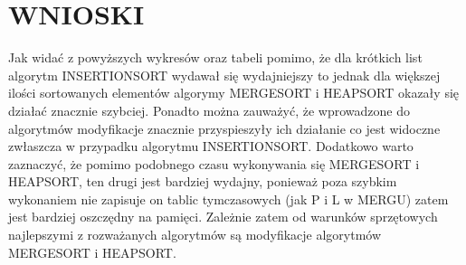 \documentclass{article}
\begin{document}
\section*{WNIOSKI}
Jak widać z powyższych wykresów oraz tabeli pomimo, że dla krótkich list algorytm INSERTIONSORT wydawał się wydajniejszy to jednak dla większej ilości sortowanych elementów algorymy MERGESORT i HEAPSORT okazały się działać znacznie szybciej. Ponadto można zauważyć, że wprowadzone do algorytmów modyfikacje znacznie przyspieszyły ich działanie co jest widoczne zwłaszcza w przypadku algorytmu INSERTIONSORT. Dodatkowo warto zaznaczyć, że pomimo podobnego czasu wykonywania się MERGESORT i HEAPSORT, ten drugi jest bardziej wydajny, ponieważ poza szybkim wykonaniem nie zapisuje on tablic tymczasowych (jak P i L w MERGU) zatem jest bardziej oszczędny na pamięci. Zależnie zatem od warunków sprzętowych najlepszymi z rozważanych algorytmów są modyfikacje algorytmów MERGESORT i HEAPSORT.
\end{document}

